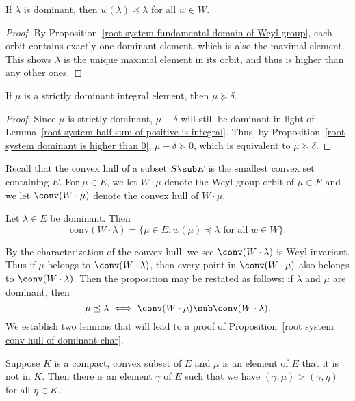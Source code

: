 \begin{proposition}\label{root system dominant is higher in W-conjugation}
If $\lambda$ is dominant, then $w(\lambda)\preceq\lambda$ for all $w\in W$.
\end{proposition}
\begin{proof}
By Proposition~\ref{root system fundamental domain of Weyl group}, each orbit contains exactly one dominant element, which is also the maximal element. This shows $\lambda$ is the unique maximal element in its orbit, and thus is higher than any other ones.
\end{proof}
\begin{proposition}\label{root system strict dominant bigger than delta}
If $\mu$ is a strictly dominant integral element, then $\mu\succeq\delta$.
\end{proposition}
\begin{proof}
Since $\mu$ is strictly dominant, $\mu-\delta$ will still be dominant in light of Lemma~\ref{root system half sum of positive is integral}. Thus, by Proposition~\ref{root system dominant is higher than 0}, $\mu-\delta\succeq 0$, which is equivalent to $\mu\succeq\delta$.
\end{proof}
Recall that the convex hull of a subset $S\sub E$ is the smallest convex set containing $E$. For $\mu\in E$, we let $W\cdot\mu$ denote the Weyl-group orbit of $\mu\in E$ and we let $\conv(W\cdot\mu)$ denote the convex hull of $W\cdot\mu$.
\begin{proposition}\label{root system conv hull of dominant char}
Let $\lambda\in E$ be dominant. Then
\[\mathrm{conv}(W\cdot\lambda)=\{\mu\in E:w(\mu)\preceq\lambda\text{ for all $w\in W$}\}.\]
\end{proposition}
By the characterization of the convex hull, we see $\conv(W\cdot\lambda)$ is Weyl invariant. Thus if $\mu$ belongs to $\conv(W\cdot\lambda)$, then every point in $\conv(W\cdot\mu)$ also belongs to $\conv(W\cdot\lambda)$. Then the proposition may be restated as follows: if $\lambda$ and $\mu$ are dominant, then
\[\mu\preceq\lambda\iff\conv(W\cdot\mu)\sub\conv(W\cdot\lambda).\]
We establish two lemmas that will lead to a proof of Proposition~\ref{root system conv hull of dominant char}.
\begin{lemma}\label{root system convex set separation lemma}
Suppose $K$ is a compact, convex subset of $E$ and $\mu$ is an element of $E$ that it is not in $K$. Then there is an element $\gamma$ of $E$ such that we have $(\gamma,\mu)>(\gamma,\eta)$ for all $\eta\in K$.
\end{lemma}
